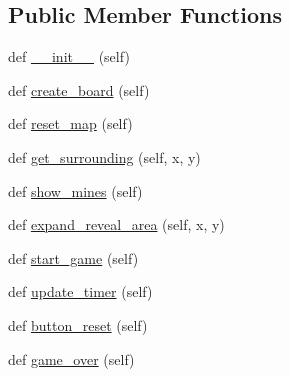 \subsection*{Public Member Functions}
\begin{DoxyCompactItemize}
\item 
def \mbox{\hyperlink{classminesweeper_1_1main__window_a233c53b9f3e9d9076ae9d82394c6d39d}{\+\_\+\+\_\+init\+\_\+\+\_\+}} (self)
\item 
def \mbox{\hyperlink{classminesweeper_1_1main__window_a6484d10285bdbd2efd5e7c73bbb56eac}{create\+\_\+board}} (self)
\item 
def \mbox{\hyperlink{classminesweeper_1_1main__window_aea1291809d107de9efaf1b7ed5f939a6}{reset\+\_\+map}} (self)
\item 
def \mbox{\hyperlink{classminesweeper_1_1main__window_a565763aa263b90221a95c8ac31b4da9b}{get\+\_\+surrounding}} (self, x, y)
\item 
def \mbox{\hyperlink{classminesweeper_1_1main__window_a6c5274b46e4ea0df40ec603d8afb1960}{show\+\_\+mines}} (self)
\item 
def \mbox{\hyperlink{classminesweeper_1_1main__window_a7be97a6fb6d4e5a22e73dcd896d485bc}{expand\+\_\+reveal\+\_\+area}} (self, x, y)
\item 
def \mbox{\hyperlink{classminesweeper_1_1main__window_a1c63f5ae2b6e8b5a4d2733ee87a3db08}{start\+\_\+game}} (self)
\item 
def \mbox{\hyperlink{classminesweeper_1_1main__window_a967e8500df09832fe84aa04cb6f496ea}{update\+\_\+timer}} (self)
\item 
def \mbox{\hyperlink{classminesweeper_1_1main__window_ab868b57184aefcec02d365776588d69b}{button\+\_\+reset}} (self)
\item 
def \mbox{\hyperlink{classminesweeper_1_1main__window_a1f06ad21fe3e6b7c7e995bb77f22ede9}{game\+\_\+over}} (self)
\end{DoxyCompactItemize}
